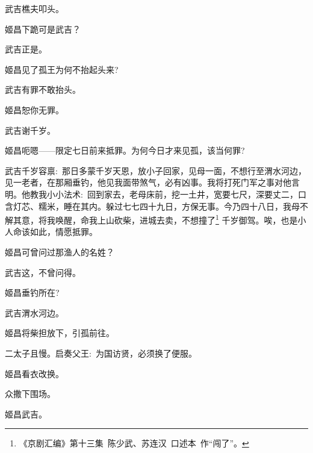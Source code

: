 {武吉\hspace{30pt}樵夫叩头。

姬昌\hspace{30pt}下跪可是武吉？

武吉\hspace{30pt}正是。

姬昌\hspace{30pt}见了孤王为何不抬起头来?

武吉\hspace{30pt}有罪不敢抬头。

姬昌\hspace{30pt}恕你无罪。

武吉\hspace{30pt}谢千岁。

姬昌\hspace{30pt}呃嗯------限定七日前来抵罪。为何今日才来见孤，该当何罪?

\setlength{\hangindent}{52pt}   %
{武吉\hspace{30pt}千岁容禀:~那日多蒙千岁天恩，放小子回家，见母一面，不想行至渭水河边，见一老者，在那厢垂钓，他见我面带煞气，必有凶事。我将打死门军之事对他言明。他教我小小法术:~回到家去，老母床前，挖一土井，宽要七尺，深要丈二，口含灯芯、糯米，睡在其内。躲过七七四十九日，方保无事。今乃四十八日，我母不解其意，将我唤醒，命我上山砍柴，进城去卖，不想撞了\footnote{《京剧汇编》第十三集~陈少武、苏连汉~口述本~作``闯了''。}%
千岁御驾。唉，也是小人命该如此，情愿抵罪。}

姬昌\hspace{30pt}可曾问过那渔人的名姓？

武吉\hspace{30pt}这，不曾问得。

姬昌\hspace{30pt}垂钓所在?

武吉\hspace{30pt}渭水河边。

姬昌\hspace{30pt}将柴担放下，引孤前往。

{\akai 二}太子\hspace{20pt}且慢。启奏父王:~为国访贤，必须换了便服。

姬昌\hspace{30pt}看衣改换。

众\hspace{41pt}撒下围场。

姬昌\hspace{30pt}武吉。

}
